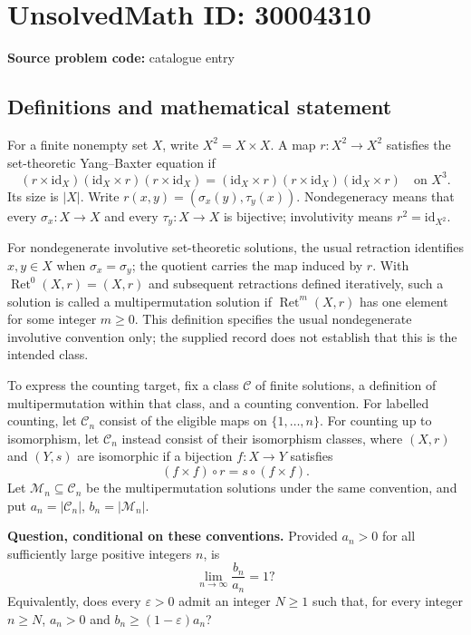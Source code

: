 \documentclass[11pt]{article}
\begin{document}
\section*{UnsolvedMath ID: 30004310}
\textbf{Source problem code:} catalogue entry
\subsection{Definitions and mathematical statement}
For a finite nonempty set \(X\), write \(X^2=X\times X\). A map \(r:X^2\to X^2\) satisfies the set-theoretic Yang--Baxter equation if
\[
(r\times\mathrm{id}_X)(\mathrm{id}_X\times r)(r\times\mathrm{id}_X)
=
(\mathrm{id}_X\times r)(r\times\mathrm{id}_X)(\mathrm{id}_X\times r)
\quad\text{on }X^3.
\]
Its size is \(|X|\). Write \(r(x,y)=(\sigma_x(y),\tau_y(x))\). Nondegeneracy means that every \(\sigma_x:X\to X\) and every \(\tau_y:X\to X\) is bijective; involutivity means \(r^2=\mathrm{id}_{X^2}\).

For nondegenerate involutive set-theoretic solutions, the usual retraction identifies \(x,y\in X\) when \(\sigma_x=\sigma_y\); the quotient carries the map induced by \(r\). With \(\operatorname{Ret}^0(X,r)=(X,r)\) and subsequent retractions defined iteratively, such a solution is called a multipermutation solution if \(\operatorname{Ret}^m(X,r)\) has one element for some integer \(m\geq 0\). This definition specifies the usual nondegenerate involutive convention only; the supplied record does not establish that this is the intended class.

To express the counting target, fix a class \(\mathcal C\) of finite solutions, a definition of multipermutation within that class, and a counting convention. For labelled counting, let \(\mathcal C_n\) consist of the eligible maps on \(\{1,\ldots,n\}\). For counting up to isomorphism, let \(\mathcal C_n\) instead consist of their isomorphism classes, where \((X,r)\) and \((Y,s)\) are isomorphic if a bijection \(f:X\to Y\) satisfies
\[
(f\times f)\circ r=s\circ(f\times f).
\]
Let \(\mathcal M_n\subseteq\mathcal C_n\) be the multipermutation solutions under the same convention, and put \(a_n=|\mathcal C_n|\), \(b_n=|\mathcal M_n|\).

\textbf{Question, conditional on these conventions.} Provided \(a_n>0\) for all sufficiently large positive integers \(n\), is
\[
\lim_{n\to\infty}\frac{b_n}{a_n}=1?
\]
Equivalently, does every \(\varepsilon>0\) admit an integer \(N\geq1\) such that, for every integer \(n\geq N\), \(a_n>0\) and \(b_n\geq(1-\varepsilon)a_n\)?
\end{document}

